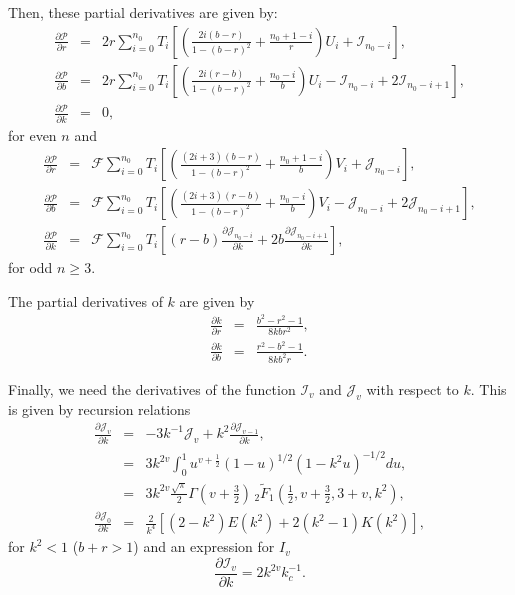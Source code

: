 \documentclass[modern]{aastex61}
\begin{document}
Then, these partial derivatives are given by:
\begin{eqnarray}
\frac{\partial \mathcal{P}}{\partial r}  &=& 2r\sum_{i=0}^{n_0} T_i  \left[\left(\frac{2i(b-r)}{1-(b-r)^2} + \frac{n_0+1-i}{r}\right) U_i + \mathcal{I}_{n_0-i}\right],\\
\frac{\partial \mathcal{P}}{\partial b}  &=& 2r\sum_{i=0}^{n_0} T_i  \left[\left(\frac{2i(r-b)}{1-(b-r)^2} + \frac{n_0-i}{b}\right) U_i - \mathcal{I}_{n_0-i} + 2\mathcal{I}_{n_0-i+1}\right],\\
\frac{\partial \mathcal{P}}{\partial k}  &=& 0,
\end{eqnarray}
for even $n$ and
\begin{eqnarray}
\frac{\partial \mathcal{P}}{\partial r}  &=& \mathcal{F}\sum_{i=0}^{n_0} T_i \left[\left(\frac{(2i+3)(b-r)}{1-(b-r)^2} + \frac{n_0+1-i}{b}\right) V_i + \mathcal{J}_{n_0-i}\right],\\
\frac{\partial \mathcal{P}}{\partial b}  &=& \mathcal{F}\sum_{i=0}^{n_0} T_i \left[\left(\frac{(2i+3)(r-b)}{1-(b-r)^2} + \frac{n_0-i}{b}\right) V_i - \mathcal{J}_{n_0-i} + 2\mathcal{J}_{n_0-i+1}\right],\\
\frac{\partial \mathcal{P}}{\partial k}  &=& \mathcal{F}\sum_{i=0}^{n_0} T_i \left[(r-b) \frac{\partial\mathcal{J}_{n_0-i}}{\partial k} + 2b \frac{\partial \mathcal{J}_{n_0-i+1}}{\partial k}\right],
\end{eqnarray}
for odd $n \ge 3$.

The partial derivatives of $k$ are given by
\begin{eqnarray}
\frac{\partial k}{\partial r} &=& \frac{b^2-r^2-1}{8 k b r^2},\\
\frac{\partial k}{\partial b} &=& \frac{r^2-b^2-1}{8 k b^2 r}.
\end{eqnarray}

Finally, we need the derivatives of the function $\mathcal{I}_v$ and $\mathcal{J}_v$
with respect to $k$.  This is given by recursion relations
\begin{eqnarray}
\frac{\partial \mathcal{J}_v}{\partial k} &=& -3 k^{-1} \mathcal{J}_v +k^2 \frac{\partial \mathcal{J}_{v-1}}{\partial k},\\
&=& 3 k^{2v} \int_0^1 u^{v+\tfrac{1}{2}} (1-u)^{1/2} (1-k^2u)^{-1/2}du,\\ 
&=& 3 k^{2v} \frac{\sqrt{\pi}}{2} \Gamma(v+\tfrac{3}{2}) \,_2{\tilde F}_1(\tfrac{1}{2},v+\tfrac{3}{2},3+v,k^2),\\
\frac{\partial \mathcal{J}_0}{\partial k} &=& \frac{2}{k^4}\left[(2-k^2)E(k^2)+2(k^2-1)K(k^2)\right],
\end{eqnarray}
for $k^2 < 1$ ($b+r > 1$) and an expression for $I_v$
\begin{equation}
\frac{\partial \mathcal{I}_v}{\partial k} = 2k^{2v} k_c^{-1}.
\end{equation}
\end{document}
